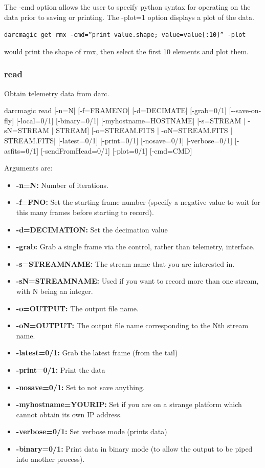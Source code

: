 \documentclass[a4,10pt]{article}
\begin{document}
The -cmd
option allows the user to specify python syntax for operating on the
data prior to saving or printing.  The -plot=1 option displays a plot
of the data.

{\tt darcmagic get rmx -cmd=''print value.shape; value=value[:10]'' -plot}

would print the shape of rmx, then select the first 10 elements and
plot them.

\subsubsection{read}
Obtain telemetry data from darc.

darcmagic read [-n=N] [-f=FRAMENO] [-d=DECIMATE] [-grab=0/1] [-{-}save-on-fly]
[-local=0/1] [-binary=0/1] [-myhostname=HOSTNAME] [-s=STREAM |
  -sN=STREAM | STREAM] [-o=STREAM.FITS | -oN=STREAM.FITS |
  STREAM.FITS] [-latest=0/1] [-print=0/1] [-nosave=0/1] [-verbose=0/1]
[-asfits=0/1] [-sendFromHead=0/1] [-plot=0/1] [-cmd=CMD]

Arguments are:
\begin{itemize}
\item {\bf -n=N:} Number of iterations.
\item {\bf -f=FNO:} Set the starting frame number (specify a negative value
  to wait for this many frames before starting to record).
\item {\bf -d=DECIMATION:} Set the decimation value
\item {\bf -grab:} Grab a single frame via the control, rather than
  telemetry, interface.
\item {\bf -s=STREAMNAME:} The stream name that you are interested in.
\item {\bf -sN=STREAMNAME:} Used if you want to record more than one stream,
  with N being an integer.
\item {\bf -o=OUTPUT:} The output file name.
\item {\bf -oN=OUTPUT:} The output file name corresponding to the Nth stream
  name.
\item {\bf -latest=0/1:} Grab the latest frame (from the tail)
\item {\bf -print=0/1:} Print the data
\item {\bf -nosave=0/1:} Set to not save anything.
\item {\bf -myhostname=YOURIP:} Set if you are on a strange platform which
  cannot obtain its own IP address.
\item {\bf -verbose=0/1:} Set verbose mode (prints data)
\item {\bf -binary=0/1:} Print data in binary mode (to allow the output to
  be piped into another process).
\end{itemize}
\end{document}
